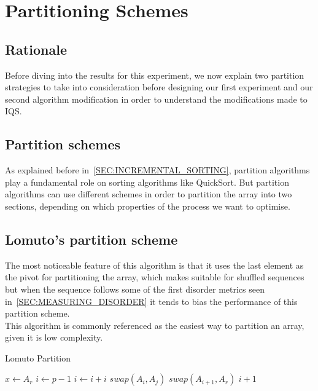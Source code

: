 \section{Partitioning Schemes}
\label{SECTION:PARTITIONING_SCHEMES}

\subsection{Rationale}
Before diving into the results for this experiment, we now explain two partition strategies to take into consideration before designing our first experiment and our second algorithm modification in order to understand the modifications made to IQS.\\

\subsection{Partition schemes}
As explained before in~\ref{SEC:INCREMENTAL_SORTING}, partition algorithms play a fundamental role on sorting algorithms like QuickSort. But partition algorithms can use different schemes in order to partition the array into two sections, depending on which properties of the process we want to optimise.\\

\subsection{Lomuto's partition scheme}

The most noticeable feature of this algorithm is that it uses the last element as the pivot for partitioning the array, which makes suitable for shuffled sequences but when the sequence follows some of the first disorder metrics seen in~\ref{SEC:MEASURING_DISORDER} it tends to bias the performance of this partition scheme.\\

This algorithm is commonly referenced as the easiest way to partition an array, given it is low complexity.\\

\begin{algorithm}
\caption{Lomuto Partition}\label{ALG:LOMUTO_PARTITION}
\begin{algorithmic}[1]
    \State $x \gets A_r$
    \State $i \gets p-1$
        \State $i \gets i + i$
        \State $swap(A_i, A_j)$
    \EndIf
    \EndFor
    \State $swap(A_{i+1}, A_r)$
    \State \Return $i + 1$
    \EndProcedure
\end{algorithmic}
\end{algorithm}

